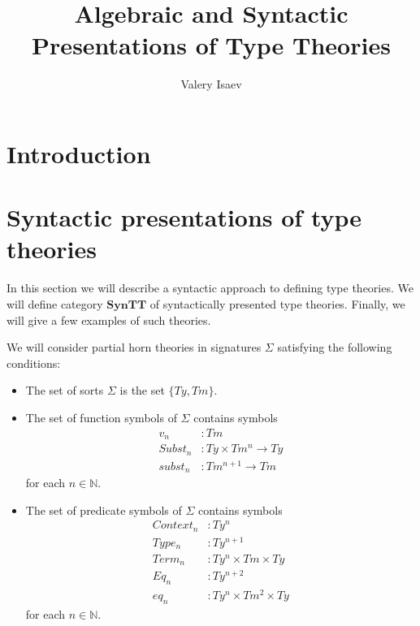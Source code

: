 \documentclass{amsart}
\theoremstyle{definition}
\theoremstyle{remark}
\newcommand{\cat}[1]{\mathbf{#1}}
\newcommand{\syntt}{\cat{SynTT}}
\numberwithin{figure}{section}
\begin{document}
\title{Algebraic and Syntactic Presentations of Type Theories}

\author{Valery Isaev}


\maketitle

\section{Introduction}

\begin{comment}
\section{Contextual categories}

Contextual categories were defined by Cartmell \cite{GAT}.
An equivalent definition was given by Voevodsky in \cite{c-systems}.
In this section we will give another equivalent definition which is just a description of models of the initial algebraic type theory as we will see later.
\end{comment}

\section{Syntactic presentations of type theories}

In this section we will describe a syntactic approach to defining type theories.
We will define category $\syntt$ of syntactically presented type theories.
Finally, we will give a few examples of such theories.


We will consider partial horn theories in signatures $\Sigma$ satisfying the following conditions:
\begin{itemize}
\item The set of sorts $\Sigma$ is the set $\{ Ty, Tm \}$.
\item The set of function symbols of $\Sigma$ contains symbols
\begin{align*}
v_n     & : Tm \\
Subst_n & : Ty \times Tm^n \to Ty \\
subst_n & : Tm^{n+1} \to Tm
\end{align*}
for each $n \in \mathbb{N}$.
\item The set of predicate symbols of $\Sigma$ contains symbols
\begin{align*}
Context_n & : Ty^n \\
Type_n & : Ty^{n+1} \\
Term_n & : Ty^n \times Tm \times Ty \\
Eq_n & : Ty^{n+2} \\
eq_n & : Ty^n \times Tm^2 \times Ty
\end{align*}
for each $n \in \mathbb{N}$.
\end{itemize}
\end{document}
